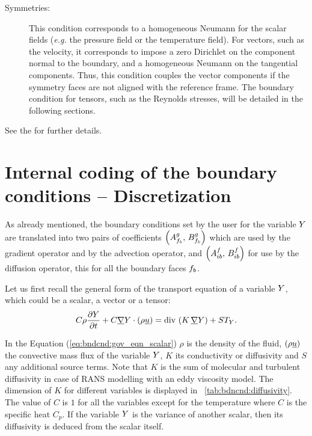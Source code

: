 \begin{description}
\item[Symmetries:] This condition corresponds to a homogeneous Neumann for the scalar fields
(\emph{e.g.} the pressure field or the temperature field). For vectors, such as the velocity, it corresponds
to impose a zero Dirichlet on the component normal to the boundary, and a homogeneous Neumann
on the tangential components. Thus, this condition couples the  vector components if the symmetry faces are not
aligned with the reference frame. The boundary condition for tensors, such as the Reynolds stresses, will be detailed in the following sections.
\end{description}

See the  for further details.

\section{Internal coding of the boundary conditions -- Discretization}

As already mentioned, the boundary conditions set by the user for the variable $Y$
are translated into two pairs of coefficients $\left( A^g_{f_{b}} , \, B^g_{f_{b}}\right)$ which are used by the gradient operator and by the advection operator, and $\left( A^f_{ib} , \, B^f_{ib}\right)$ for use by the diffusion operator, this for all the boundary faces ${f_{b}}$.

Let us first recall the general form of the transport equation of a variable $Y$, which could be a scalar,
a vector or a tensor:
\begin{equation}\label{eq:bndcnd:gov_eqn_scalar}
\displaystyle C \rho \frac{\partial Y}{\partial t} + C \underline{\nabla} Y \cdot \left( \rho \underline{u} \right) = \text{div}\, \left(\displaystyle K \, \underline{\nabla} Y \right) +ST_Y .
\end{equation}

In the Equation (\ref{eq:bndcnd:gov_eqn_scalar})
$\rho$ is the density of the fluid, $\left( \rho \underline{u} \right)$ the convective mass flux of the variable $Y$, $K$ its
conductivity or diffusivity and $S$ any additional source terms.
Note that $K$ is the sum of molecular and turbulent diffusivity in case of RANS modelling with an eddy viscosity model.
The dimension of $K$ for different variables is displayed in \tablename~\ref{tab:bdncnd:diffusivity}.
The value of $C$ is $1$ for all the variables except for the temperature where $C$ is the specific heat $C_p$.
If the variable $Y$ is the variance of another scalar, then its diffusivity
is deduced from the scalar itself.

